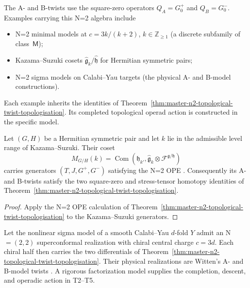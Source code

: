 \begin{remark}
\label{rem:master-n2-twist-scope}
The A- and B-twists use the square-zero operators
$Q_A=G^+_0$ and $Q_B=G^-_0$.  Examples carrying this N=2 algebra
include
\begin{itemize}[noitemsep]
\item N=2 minimal models at $c = 3k/(k+2)$, $k \in \mathbb Z_{\geq 1}$
\textup{(}a discrete subfamily of class~$\mathsf M$\textup{);}
\item Kazama--Suzuki cosets $\widehat{\mathfrak g}_k /
\widehat{\mathfrak h}$ for Hermitian symmetric pairs;
\item N=2 sigma models on Calabi--Yau targets
\textup{(}the physical A- and B-model constructions\textup{).}
\end{itemize}
Each example inherits the identities of
Theorem~\ref{thm:master-n2-topological-twist-topologisation}.  Its
completed topological operad action is constructed in the specific
model.
\end{remark}

\begin{corollary}
\label{cor:master-n2-twist-kazama-suzuki}
Let $(G,H)$ be a Hermitian symmetric pair and let $k$ lie in the
admissible level range of Kazama--Suzuki.  Their coset
\[
M_{G/H}(k)
 =\operatorname{Com}\!\left(
 \widehat{\mathfrak h}_{k'},
 \widehat{\mathfrak g}_k\otimes
 \mathcal F^{\mathfrak g/\mathfrak h}
 \right)
\]
carries generators $(T,J,G^+,G^-)$ satisfying the N=2 OPE
\cite[equations~(3.27)--(3.30)]{KazamaSuzuki1989}.  Consequently its
A- and B-twists satisfy the two square-zero and stress-tensor
homotopy identities of
Theorem~\ref{thm:master-n2-topological-twist-topologisation}.
\end{corollary}

\begin{proof}
Apply the N=2 OPE calculation of
Theorem~\ref{thm:master-n2-topological-twist-topologisation} to the
Kazama--Suzuki generators.
\end{proof}

\begin{corollary}
\label{cor:master-n2-twist-cy-sigma}
Let the nonlinear sigma model of a smooth Calabi--Yau $d$-fold $Y$
admit an N$=(2,2)$ superconformal realization with chiral central
charge $c=3d$.  Each chiral half then carries the two differentials
of Theorem~\ref{thm:master-n2-topological-twist-topologisation}.  Their
physical realizations are Witten's A- and B-model twists
\cite{Witten91}.  A rigorous factorization model supplies the
completion, descent, and operadic action in T2--T5.
\end{corollary}

